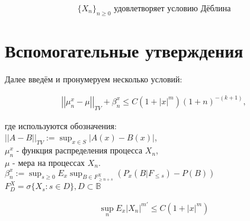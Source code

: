 \begin{equation} \label{assumption5}
    \{X_n\}_{n \geqslant 0} \text{ удовлетворяет условию Дёблина}
\end{equation}


\newpage

\section{Вспомогательные утверждения}

Далее введём и пронумеруем несколько условий:

\begin{equation} \label{total_variation_assumption}
    \begin{split}
    \left|\left| \mu^x_n - \mu \right|\right|_{TV} + \beta^x_n \le C(1 + |x|^m)(1 + n)^{-(k + 1)},
    \end{split}
\end{equation}

\begin{flushleft}
	{
		\setlength{\leftskip}{5em}
		\setlength{\rightskip}{5em}
		где используются обозначения: \\
		$ \left|\left|A-B\right|\right|_{TV} := \sup_{x \in S} \left|A(x) - B(x)\right|$, \\
		$\mu^x_n$ - функция распределения процесса $X_n$, \\
		$\mu$ - мера на процессах $X_n$. \\ %
		$\beta^x_n := \sup_{s \ge 0}E_x \sup_{B \in F^X_{\ge n + s}}\left(P_x\left(B|F_{\le s}\right) - P\left(B\right)\right)$ \\
		$F^X_D = \sigma \{ X_s : s \in D \} , D \subset \mathbb{B}$ \\
	}
\end{flushleft}
	
	
\begin{equation} \label{moments_limiting}
    \begin{split}
        \sup_n E_x \left| X_n \right| ^{m'} \le C \left( 1 + |x|^m \right)
    \end{split}
\end{equation}


